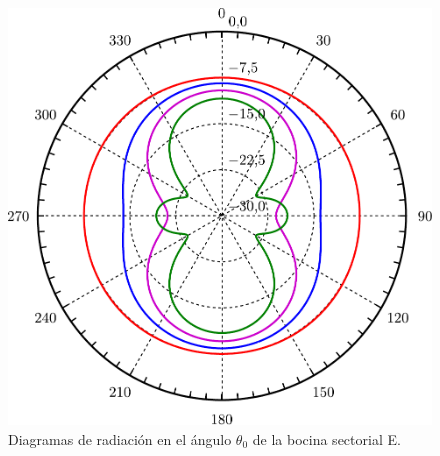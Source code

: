 \begin{figure}[H]
\centering
\includegraphics[scale = 0.5]{Figures/Estudio/estudio_26}
\caption{Diagramas de radiación en el ángulo $\theta_0$ de la bocina sectorial E.}
\label{fig_estudio:26}
\end{figure}
